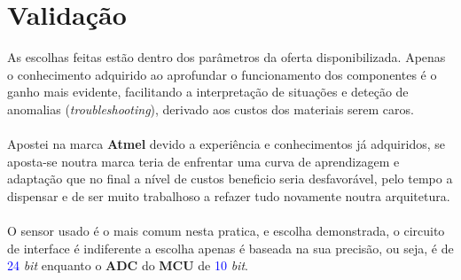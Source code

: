 \section{Validação}
As escolhas feitas estão dentro dos parâmetros da oferta disponibilizada. Apenas o conhecimento adquirido ao aprofundar o funcionamento dos componentes é o ganho mais evidente, facilitando a interpretação de situações e deteção de anomalias (\textit{troubleshooting}), derivado aos custos dos materiais serem caros.\\
\\
Apostei na marca \textbf{Atmel} devido a experiência e conhecimentos já adquiridos, se aposta-se noutra marca teria de enfrentar uma curva de aprendizagem e adaptação que no final a nível de custos beneficio seria desfavorável, pelo tempo a dispensar e de ser muito trabalhoso a refazer tudo novamente noutra arquitetura.\\
\\
O sensor usado é o mais comum nesta pratica, e escolha demonstrada, o circuito de interface é indiferente a escolha apenas é baseada na sua precisão, ou seja, é de \textcolor{blue}{24} \textit{bit} enquanto o \textbf{ADC} do \textbf{MCU} de \textcolor{blue}{10} \textit{bit}.

